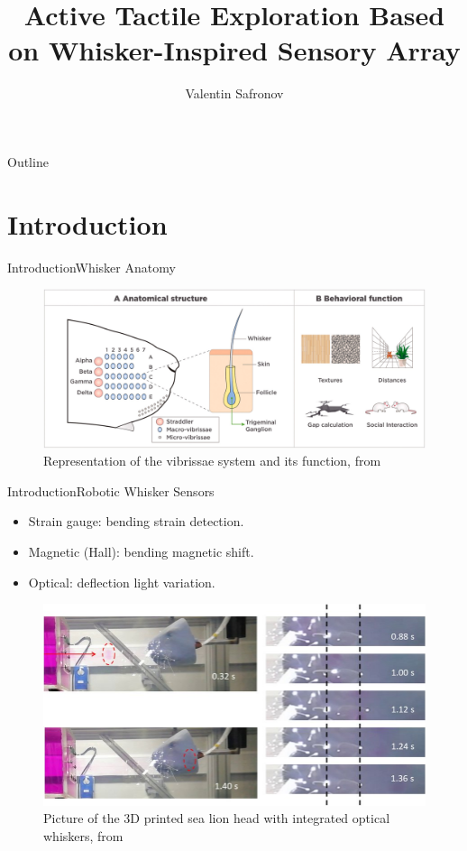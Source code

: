 \documentclass[AIRbeamer
,optEnglish
,optBiber
,optBibstyleAlphabetic
,optBeamerClassicFormat%
]{AIRlatex}
\title[Active Tactile Exploration Based on Whisker-Inspired Sensory Array]{Active Tactile Exploration Based on Whisker-Inspired Sensory Array}
\author[Valentin Safronov]{Valentin Safronov}
\date{\AIRutilsDate{28}{03}{2025}}
\begin{document}
    \AIRbeamerTitlePageStudentThesis

    \begin{frame}{Outline}
        \tableofcontents
    \end{frame}


    \section{Introduction}

    \begin{frame}{Introduction}{Whisker Anatomy}
        \begin{figure}[htb]
            \centering
            \includegraphics[width=\textwidth]{figures/whisker-anatomy}
            \caption{Representation of the vibrissae system and its function, from~\cite{IBARRACASTANEDA2022100034}}
        \end{figure}
    \end{frame}

    \begin{frame}{Introduction}{Robotic Whisker Sensors}
        \begin{itemize}
            \item Strain gauge: bending \to strain detection.
            \item Magnetic (Hall): bending \to magnetic shift.
            \item Optical: deflection \to light variation.
        \end{itemize}
        \begin{figure}[H]
            \centering
            \includegraphics[height=0.5\textheight]{figures/optical-whisker}
            \caption{Picture of the 3D printed sea lion head with integrated optical whiskers, from \cite{optical-whisker}}
        \end{figure}
    \end{frame}
\end{document}
